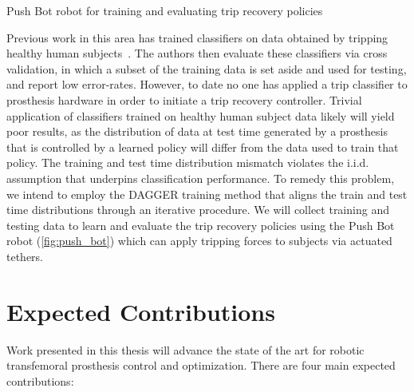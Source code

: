 \begin{marginfigure}[2in]
    \centering
    \caption{Push Bot robot for training and evaluating trip recovery policies}
    \label{fig:push_bot}
\end{marginfigure}
Previous work in this area has trained classifiers on data obtained by tripping
healthy human subjects~\citep{lawson2010stumble, shirota2014recovery}. The
authors then evaluate these classifiers via cross validation, in which a subset
of the training data is set aside and used for testing, and report low
error-rates.  However, to date no one has applied a trip classifier to
prosthesis hardware in order to initiate a trip recovery controller. Trivial
application of classifiers trained on healthy human subject data likely will
yield poor results, as the distribution of data at test time generated by a
prosthesis that is controlled by a learned policy will differ from the data used
to train that policy. The training and test time distribution mismatch violates
the i.i.d. assumption that
underpins classification performance. To remedy this problem, we intend to
employ the DAGGER training method \citep{ross2011reduction} that aligns the
train and test time distributions through an iterative procedure. We will
collect training and testing data to learn and evaluate the trip recovery
policies using the Push Bot robot (\cref{fig:push_bot}) which can apply tripping
forces to subjects via actuated tethers.

\section{Expected Contributions}\label{sec:intro_contributions}

Work presented in this thesis will advance the state of the art for robotic
transfemoral prosthesis control and optimization. There are four main expected 
contributions: 

